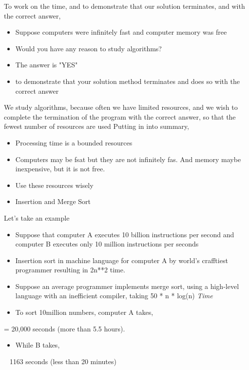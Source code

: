 \documentclass{article}
\begin{document}
    To work on the time, and to demonstrate that our solution terminates, and with the correct answer,

    \begin{itemize}
        \item Suppose computers were infinitely fast and computer memory was free
        \item Would you have any reason to study algorithms?
        \item The answer is "YES"
        \item to demonstrate that your solution method terminates and does so with the correct answer
    \end{itemize}

    We study algorithms, because often we have limited resources, and we wish to complete the termination of the program with the correct answer, so that the fewest number of resources are used
    Putting in into summary,

    \begin{itemize}
        \item Processing time is a bounded resources
        \item Computers may be fsat but they are not infinitely fas. And memory maybe inexpensive, but it is not free.
        \item Use these resources wisely
        \item Insertion and Merge Sort
    \end{itemize}

    Let's take an example

    \begin{itemize}
        \item Suppose that computer A executes 10 billion instructions per second and computer B executes only 10 million instructions per seconds
        \item Insertion sort in machine language for computer A by world's crafftiest programmer resulting in 2n**2 time.
        \item Suppose an average programmer implements merge sort, using a high-level language with an inefficient compiler, taking 50 * n * log(n) \textit{Time}
        \item To sort 10million numbers, computer A takes,
    \end{itemize}
         = 20,000 seconds (more than 5.5 hours). 
    \begin{itemize}
        \item While B takes,
    \end{itemize}
         ~ 1163 seconds (less than 20 minutes)
\end{document}
